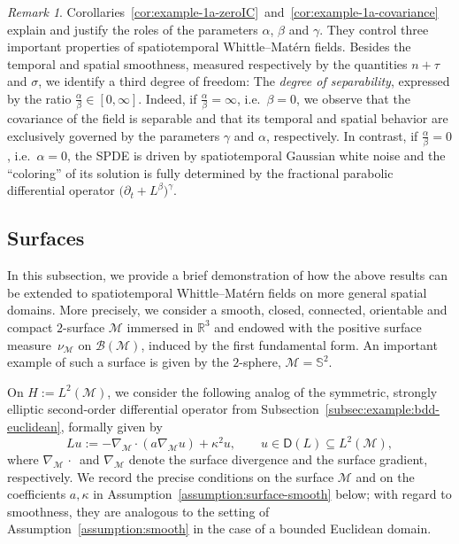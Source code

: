 \documentclass[reqno]{amsart}
\numberwithin{equation}{section}
\newcommand{\R}{\mathbb{R}}
\newcommand{\cB}{\mathcal{B}}
\newcommand{\cM}{\mathcal{M}}
\theoremstyle{remark}
\newtheorem{remark}[lemma]{Remark}
\theoremstyle{definition}
\begin{document}
\begin{remark}
	Corollaries~\ref{cor:example-1a-zeroIC}~and~\ref{cor:example-1a-covariance}
	explain and justify the roles of 
	the parameters
	$\alpha$, $\beta$ and $\gamma$. 
	They control three important 
	properties of spatiotemporal 
	Whittle--Mat\'{e}rn fields. 
	Besides the temporal and spatial smoothness,
	measured respectively by the quantities
	$n+\tau$ and $\sigma$,
	we identify a third degree of freedom: The
	\emph{degree of separability}, 
	expressed by the ratio $\frac{\alpha}{\beta}\in[0,\infty]$.
	Indeed, if $\frac{\alpha}{\beta} = \infty$, 
	i.e.\ $\beta = 0$, we observe that the
	covariance of the field is separable and that its
	temporal and spatial behavior are exclusively 
	governed by the parameters 
	$\gamma$ and $\alpha$, respectively.
	In contrast, if $\frac{\alpha}{\beta} = 0$, 
	i.e.\ $\alpha = 0$, 
	the SPDE is driven by spatiotemporal Gaussian white noise 
	and the ``coloring'' of its solution is fully determined by 
	the fractional parabolic differential operator 
	$\bigl(\partial_t + L^\beta \bigr)^\gamma$\!. 
\end{remark}

\subsection{Surfaces}
\label{subsec:example:surfaces}

In this subsection, we 
provide a brief demonstration of 
how the
above results can be extended to spatiotemporal 
Whittle--Mat\'ern fields on more general 
spatial domains. 
More precisely, we consider a smooth, closed, 
connected, orientable and compact $2$-surface $\cM$
immersed in $\R^3$ and endowed with
the positive surface measure~$\nu_\cM$ on $\cB(\cM)$,
induced by the first fundamental form. 
An important example of such a surface is given 
by the $2$-sphere, $\cM=\mathbb{S}^2$\!. 

On
$H := L^2(\cM)$, we consider the 
following analog of the
symmetric, strongly elliptic second-order 
differential operator from
Subsection~\ref{subsec:example:bdd-euclidean}, formally given by
%
\[
Lu := -\nabla_\cM \cdot (a\nabla_\cM u)
+
\kappa^2 u,
\qquad 
u \in \mathsf D(L)\subseteq L^2(\cM),
\] 
%
where $\nabla_{\cM}\,\cdot\,$ and 
$\nabla_{\cM}$ denote 
the surface divergence and 
the surface gradient, respectively. 
We record the precise
conditions on the surface $\cM$ and on the coefficients $a,\kappa$ 
in Assumption~\ref{assumption:surface-smooth} below; 
with regard to smoothness, they 
are analogous to the setting of Assumption~\ref{assumption:smooth}
in the case of a bounded Euclidean domain. 
\end{document}
